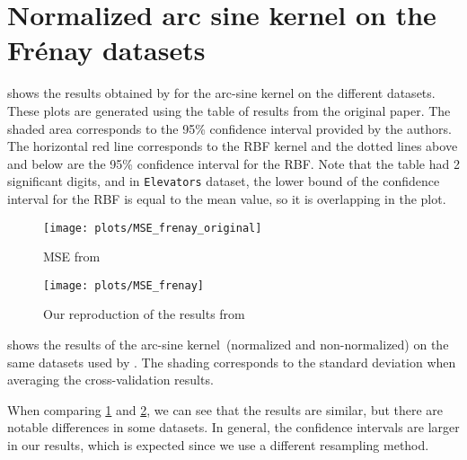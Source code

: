 
\section{Normalized arc sine kernel on the Frénay datasets}

 shows the results obtained by
\textcite{frenayParameterinsensitiveKernelExtreme2011} for the arc-sine kernel
on the different datasets. These plots are generated using the table of results
from the original paper. The shaded area corresponds to the 95\% confidence
interval provided by the authors. The horizontal red line corresponds to the RBF kernel and
the dotted lines above and below are the 95\% confidence interval for the RBF.
Note that the table had 2 significant digits, and in \texttt{Elevators} dataset, the
lower bound of the confidence interval for the RBF is equal to the mean value,
so it is overlapping in the plot.

\begin{figure}[H]
    \texttt{[image: plots/MSE\_frenay\_original]}
    \caption{MSE from \cite{frenayParameterinsensitiveKernelExtreme2011}}
    \label{fig:mse-frenay-original}
\end{figure}

\begin{figure}[H]
    \texttt{[image: plots/MSE\_frenay]}
    \caption{Our reproduction of the results from \cite{frenayParameterinsensitiveKernelExtreme2011}}
    \label{fig:mse-frenay}
\end{figure}

 shows the results of the arc-sine
kernel~(normalized and non-normalized) on the same datasets used by \textcite{frenayParameterinsensitiveKernelExtreme2011}. The shading corresponds to the standard deviation when averaging the
cross-validation results.

When comparing \cref{fig:mse-frenay-original} and \cref{fig:mse-frenay}, we
can see that the results are similar, but there are notable differences in some
datasets. In general, the confidence intervals are larger in our results, which
is expected since we use a different resampling method.


